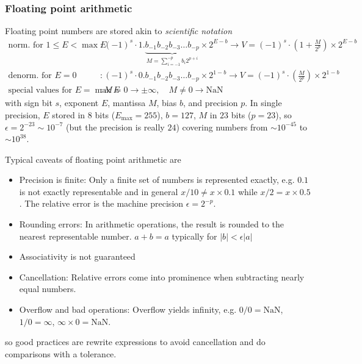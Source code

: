 \subsubsection*{Floating point arithmetic}
Floating point numbers are stored akin to \textit{scientific notation}
\begin{equation}
    \begin{aligned}
        \text{norm. for } 1 \leq E < \max{E}&: (-1)^s \cdot 1.\underbrace{b_{-1}b_{-2}b_{-3} \ldots b_{-p}}_{M = \sum_{i=-1}^{-p} b_i 2^{p+i}} \times 2^{E-b} \rightarrow V = (-1)^s \cdot \left( 1 + \frac{M}{2^p} \right) \times 2^{E-b} \\
        \text{denorm. for } E = 0 &: (-1)^s \cdot 0.b_{-1}b_{-2}b_{-3} \ldots b_{-p} \times 2^{1-b} \rightarrow V = (-1)^s \cdot \left( \frac{M}{2^p} \right) \times 2^{1-b} \\
        \text{special values for } E = \max{E}&: M = 0 \rightarrow \pm \infty, \quad M \neq 0 \rightarrow \text{NaN}
    \end{aligned}
\end{equation}
with sign bit $s$, exponent $E$, mantissa $M$, bias $b$, and precision $p$.
In single precision, $E$ stored in $8$ bits ($E_\text{max} = 255$), $b = 127$, $M$ in $23$ bits ($p = 23$), so $\epsilon = 2^{-23} \sim 10^{-7}$ (but the 
precision is really $24$) covering numbers from $\sim 10^{-45}$ to $\sim 10^{38}$.

Typical \textcolor{red1}{caveats of floating point arithmetic} are
\begin{itemize}
    \item Precision is finite: Only a finite set of numbers is represented exactly, e.g. $0.1$ is not exactly representable and in general $x \slash 10 \neq x \times 0.1$ while $x \slash 2 = x \times 0.5$.
    The relative error is the machine precision $\epsilon = 2^{-p}$.
    \item Rounding errors: In arithmetic operations, the result is rounded to the nearest representable number.
    $a + b = a$ typically for $|b| < \epsilon |a|$
    \item Associativity is not guaranteed
    \item Cancellation: Relative errors come into prominence when subtracting nearly equal numbers.
    \item Overflow and bad operations: Overflow yields infinity, e.g. $0 \slash 0 = \text{NaN}$, $1 \slash 0 = \infty$, $\infty \times 0 = \text{NaN}$.
\end{itemize}
so \textcolor{green1}{good practices} are rewrite expressions to avoid cancellation and do comparisons
with a tolerance.

